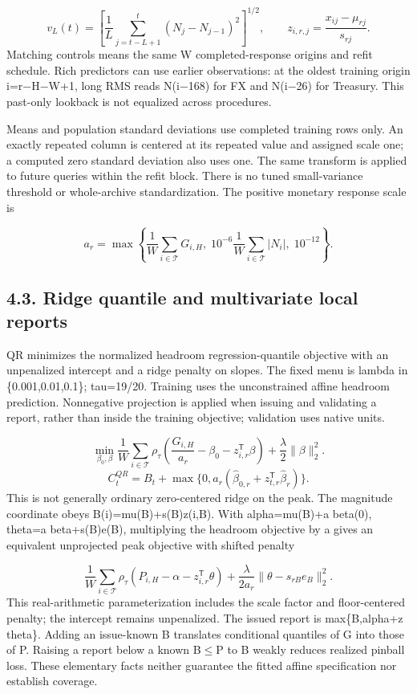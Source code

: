 \documentclass[10pt,a4paper]{article}
\begin{document}
\[
v_L(t)=\left[\frac1L\sum_{j=t-L+1}^{t}(N_j-N_{j-1})^2\right]^{1/2},\qquad z_{i,r,j}=\frac{x_{ij}-\mu_{rj}}{s_{rj}}.
\]
Matching controls means the same W completed-response origins and refit schedule. Rich predictors can use earlier observations: at the oldest training origin i=r\(-\)H\(-\)W+1, long RMS reads N(i\(-\)168) for FX and N(i\(-\)26) for Treasury. This past-only lookback is not equalized across procedures.

Means and population standard deviations use completed training rows only. An exactly repeated column is centered at its repeated value and assigned scale one; a computed zero standard deviation also uses one. The same transform is applied to future queries within the refit block. There is no tuned small-variance threshold or whole-archive standardization. The positive monetary response scale is

\[
a_r=\max\left\{\frac1W\sum_{i\in\mathcal T}G_{i,H},\;10^{-6}\frac1W\sum_{i\in\mathcal T}|N_i|,\;10^{-12}\right\}.
\]
\subsection*{4.3. Ridge quantile and multivariate local reports}
QR minimizes the normalized headroom regression-quantile objective with an unpenalized intercept and a ridge penalty on slopes. The fixed menu is lambda in \{0.001,0.01,0.1\}; tau=19/20. Training uses the unconstrained affine headroom prediction. Nonnegative projection is applied when issuing and validating a report, rather than inside the training objective; validation uses native units.

\[
\min_{\beta_0,\beta}\frac1W\sum_{i\in\mathcal T}\rho_\tau\!\left(\frac{G_{i,H}}{a_r}-\beta_0-z_{i,r}^{\mathsf T}\beta\right)+\frac\lambda2\|\beta\|_2^2.
\]
\[
C_t^{QR}=B_t+\max\{0,a_r(\widehat\beta_{0,r}+z_{t,r}^{\mathsf T}\widehat\beta_r)\}.
\]
This is not generally ordinary zero-centered ridge on the peak. The magnitude coordinate obeys B(i)=mu(B)+s(B)z(i,B). With alpha=mu(B)+a beta(0), theta=a beta+s(B)e(B), multiplying the headroom objective by a gives an equivalent unprojected peak objective with shifted penalty

\[
\frac1W\sum_{i\in\mathcal T}\rho_\tau(P_{i,H}-\alpha-z_{i,r}^{\mathsf T}\theta)+\frac{\lambda}{2a_r}\|\theta-s_{rB}e_B\|_2^2.
\]
This real-arithmetic parameterization includes the scale factor and floor-centered penalty; the intercept remains unpenalized. The issued report is max\{B,alpha+z theta\}. Adding an issue-known B translates conditional quantiles of G into those of P. Raising a report below a known B\(\le\)P to B weakly reduces realized pinball loss. These elementary facts neither guarantee the fitted affine specification nor establish coverage.
\end{document}
